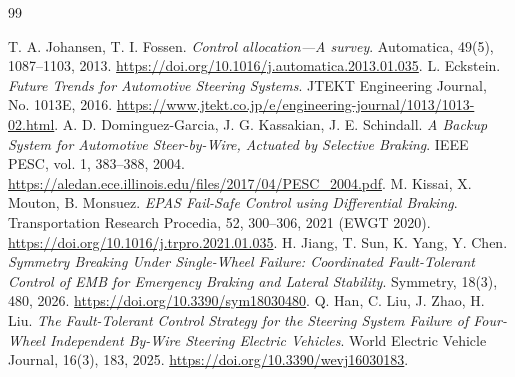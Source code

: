 \documentclass[11pt,a4paper,oneside]{report}
\begin{document}
\begingroup\small{}\begin{thebibliography}{99}

 T. A. Johansen, T. I. Fossen. \emph{Control allocation---A survey}. Automatica, 49(5), 1087--1103, 2013. \url{https://doi.org/10.1016/j.automatica.2013.01.035}.
 L. Eckstein. \emph{Future Trends for Automotive Steering Systems}. JTEKT Engineering Journal, No. 1013E, 2016. \url{https://www.jtekt.co.jp/e/engineering-journal/1013/1013-02.html}.
 A. D. Dominguez-Garcia, J. G. Kassakian, J. E. Schindall. \emph{A Backup System for Automotive Steer-by-Wire, Actuated by Selective Braking}. IEEE PESC, vol. 1, 383--388, 2004. \url{https://aledan.ece.illinois.edu/files/2017/04/PESC_2004.pdf}.
 M. Kissai, X. Mouton, B. Monsuez. \emph{EPAS Fail-Safe Control using Differential Braking}. Transportation Research Procedia, 52, 300--306, 2021 (EWGT 2020). \url{https://doi.org/10.1016/j.trpro.2021.01.035}.
 H. Jiang, T. Sun, K. Yang, Y. Chen. \emph{Symmetry Breaking Under Single-Wheel Failure: Coordinated Fault-Tolerant Control of EMB for Emergency Braking and Lateral Stability}. Symmetry, 18(3), 480, 2026. \url{https://doi.org/10.3390/sym18030480}.
 Q. Han, C. Liu, J. Zhao, H. Liu. \emph{The Fault-Tolerant Control Strategy for the Steering System Failure of Four-Wheel Independent By-Wire Steering Electric Vehicles}. World Electric Vehicle Journal, 16(3), 183, 2025. \url{https://doi.org/10.3390/wevj16030183}.


\end{thebibliography}
\end{document}
